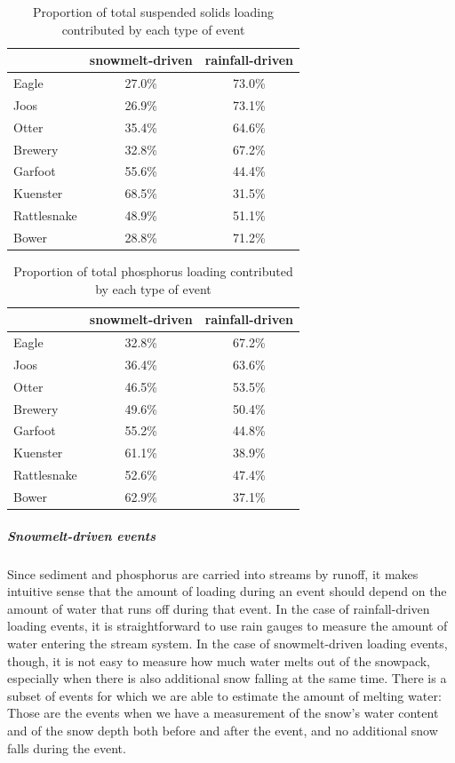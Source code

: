 \documentclass[10pt]{article}
\begin{document}
\begin{table}[ht]
\begin{center}
\begin{tabular}{lcc}
  & snowmelt-driven & rainfall-driven \\ 
  \hline
Eagle & 27.0\% & 73.0\% \\ 
  Joos & 26.9\% & 73.1\% \\ 
  Otter & 35.4\% & 64.6\% \\ 
  Brewery & 32.8\% & 67.2\% \\ 
  Garfoot & 55.6\% & 44.4\% \\ 
  Kuenster & 68.5\% & 31.5\% \\ 
  Rattlesnake & 48.9\% & 51.1\% \\ 
  Bower & 28.8\% & 71.2\% \\ 
  \end{tabular}
\caption{Proportion of total suspended solids loading contributed by each type of event}
\label{tab:stot}
\end{center}
\end{table}
\begin{table}[ht]
\begin{center}
\begin{tabular}{lcc}
  & snowmelt-driven & rainfall-driven \\ 
  \hline
Eagle & 32.8\% & 67.2\% \\ 
  Joos & 36.4\% & 63.6\% \\ 
  Otter & 46.5\% & 53.5\% \\ 
  Brewery & 49.6\% & 50.4\% \\ 
  Garfoot & 55.2\% & 44.8\% \\ 
  Kuenster & 61.1\% & 38.9\% \\ 
  Rattlesnake & 52.6\% & 47.4\% \\ 
  Bower & 62.9\% & 37.1\% \\ 
  \end{tabular}
\caption{Proportion of total phosphorus loading contributed by each type of event}
\label{tab:ptot}
\end{center}
\end{table}
\subparagraph{Snowmelt-driven events}
Since sediment and phosphorus are carried into streams by runoff, it makes intuitive sense that the amount of loading during an event should depend on the amount of water that runs off during that event. In the case of rainfall-driven loading events, it is straightforward to use rain gauges to measure the amount of water entering the stream system. In the case of snowmelt-driven loading events, though, it is not easy to measure how much water melts out of the snowpack, especially when there is also additional snow falling at the same time. There is a subset of events for which we are able to estimate the amount of melting water: Those are the events when we have a measurement of the snow's water content and of the snow depth both before and after the event, and no additional snow falls during the event.\\
\end{document}
